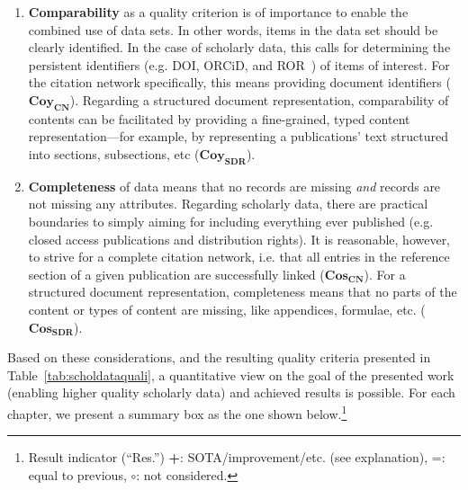 \begin{enumerate}
    \item \textbf{Comparability} as a quality criterion is of importance to enable the combined use of data sets. In other words, items in the data set should be clearly identified. In the case of scholarly data, this calls for determining the persistent identifiers (e.g. DOI, ORCiD, and ROR~\cite{Meadows2019}) of items of interest. For the citation network specifically, this means providing document identifiers ($\mathbf{Coy_{CN}}$). Regarding a structured document representation, comparability of contents can be facilitated by providing a fine-grained, typed content representation---for example, by representing a publications' text structured into sections, subsections, etc ($\mathbf{Coy_{SDR}}$).
    \item \textbf{Completeness} of data means that no records are missing \emph{and} records are not missing any attributes. Regarding scholarly data, there are practical boundaries to simply aiming for including everything ever published (e.g. closed access publications and distribution rights). It is reasonable, however, to strive for a complete citation network, i.e. that all entries in the reference section of a given publication are successfully linked ($\mathbf{Cos_{CN}}$). For a structured document representation, completeness means that no parts of the content or types of content are missing, like appendices, formulae, etc. ($\mathbf{Cos_{SDR}}$). %
\end{enumerate}

Based on these considerations, and the resulting quality criteria presented in Table~\ref{tab:scholdataquali}, a quantitative view on the goal of the presented work (enabling higher quality scholarly data) and achieved results is possible.
For each chapter, we present a summary box as the one shown below.\footnote{Result indicator (``Res.'') \textbf{+}: SOTA/improvement/etc. (see explanation), =: equal to previous, $\circ$: not considered.}

